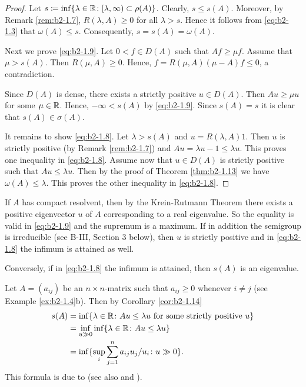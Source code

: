\begin{proof}
Let $s \coloneqq \inf\{\lambda \in \mathbb{R} \colon [\lambda,\infty) \subset \rho(A)\}$.
Clearly, $s \leq s(A)$.
Moreover, by Remark \ref{rem:b2-1.7}, $R(\lambda,A) \geq 0$ for all $\lambda > s$.
Hence it follows from \eqref{eq:b2-1.3} that $\omega(A) \leq s$.
Consequently, $s = s(A) = \omega(A)$.

Next we prove \eqref{eq:b2-1.9}.
Let $0 < f \in D(A)$ such that $Af \geq \mu f$.
Assume that $\mu > s(A)$.
Then $R(\mu,A) \geq 0$.
Hence, $f = R(\mu,A)(\mu-A)f \leq 0$, a contradiction.

Since $D(A)$ is dense, there exists a strictly positive $u \in D(A)$.
Then $Au \geq \mu u$ for some $\mu \in \mathbb{R}$.
Hence, $-\infty < s(A)$ by \eqref{eq:b2-1.9}. 
Since $s(A) = s$ it is clear that $s(A) \in \sigma(A)$.

It remains to show \eqref{eq:b2-1.8}. 
Let $\lambda > s(A)$ and $u = R(\lambda,A)1$.
Then $u$ is strictly positive (by  Remark \ref{rem:b2-1.7}) and $Au = \lambda u - 1 \leq \lambda u$.
This proves one inequality in \eqref{eq:b2-1.8}. 
Assume now that $u \in D(A)$ is strictly positive such that $Au \leq \lambda u$.
Then by the proof of Theorem \ref{thm:b2-1.13} we have $\omega(A) \leq \lambda$.
This proves the other inequality in \eqref{eq:b2-1.8}. 
\end{proof}

\begin{remark}\label{rem:b2-1.15}
If $A$ has compact resolvent, then by the Krein-Rutmann Theorem there exists a positive eigenvector $u$ of $A$ corresponding to a real eigenvalue.
So the equality is valid in \eqref{eq:b2-1.9}  
and the supremum is a maximum.
If in addition the semigroup is irreducible (see B-III, Section 3 below), then $u$ is strictly positive and in \eqref{eq:b2-1.8} 
the infimum is attained as well.

Conversely, if in \eqref{eq:b2-1.8} 
the infimum is attained, then $s(A)$ is an eigenvalue.
\end{remark}
\begin{example}\label{ex:b2-1.16}
Let $A = (a_{ij})$ be an $n \times n$-matrix such that $a_{ij} \geq 0$ whenever $i \neq j$ (see Example \ref{ex:b2-1.4}b).
Then by Corollary \ref{cor:b2-1.14} 
\begin{align*}
    s(A) &= \inf\{\lambda \in \mathbb{R} \colon Au \leq \lambda u \text{ for some strictly positive } u\} \\
    &= \inf_{u \gg 0} \inf\{\lambda \in \mathbb{R} \colon Au \leq \lambda u\} \\
    &= \inf\{\sup_{i} \sum_{j=1}^{n} a_{ij} u_{j}/u_{i} \colon u \gg 0\}.
\end{align*}
This formula is due to \citet{collatz:1942} (see also \citet[Chapter I, Exercise 20]{schaefer:1974} and \citet{wielandt:1950}).
\end{example}

